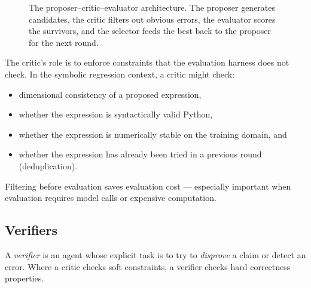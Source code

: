 \begin{figure}[htb!]
\begin{center}
\caption{The proposer--critic--evaluator architecture.
The proposer generates candidates, the critic filters out obvious errors, the evaluator scores the survivors, and the selector feeds the best back to the proposer for the next round.}
\label{figure:ProposerCritic}
\end{center}
\end{figure}

The critic's role is to enforce constraints that the evaluation harness does not check.
In the symbolic regression context, a critic might check:
\begin{itemize}
\item dimensional consistency of a proposed expression,
\item whether the expression is syntactically valid Python,
\item whether the expression is numerically stable on the training domain, and
\item whether the expression has already been tried in a previous round (deduplication).
\end{itemize}
Filtering before evaluation saves evaluation cost — especially important when evaluation requires model calls or expensive computation.

\subsection{Verifiers}

A \emph{verifier} is an agent whose explicit task is to try to \emph{disprove} a claim or detect an error.
Where a critic checks soft constraints, a verifier checks hard correctness properties.

